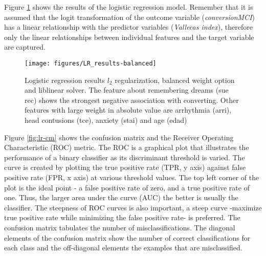 \documentclass[11pt]{article}
\theoremstyle{definition}
\theoremstyle{remark}
\begin{document}
Figure \ref{fig:logresres} shows the results of the logistic regression model. Remember that it is assumed that the logit transformation of the outcome variable (\emph{conversionMCI}) has a linear relationship with the predictor variables (\emph{Vallecas index}), therefore only the linear relationships between individual features and the target variable are captured.

\begin{figure}[H]
        \centering
        \texttt{[image: figures/LR\_results-balanced]}
        \caption{Logistic regression results $l_2$ regularization, balanced weight option and liblinear solver. The feature about remembering dreams (sue rec) shows the strongest negative association with converting. Other features with large weight in absolute value are arrhythmia (arri), head contusions (tce), anxiety (stai) and age (edad)} \label{fig:logresres}
\end{figure}


Figure \ref{fig:lr-cm} shows the confusion matrix and the Receiver Operating Characteristic (ROC) metric. 
The ROC is a graphical plot that illustrates the performance of a binary classifier as its discriminant threshold is varied. The curve is created by plotting the true positive rate (TPR, y axis) against false positive rate (FPR, x axis) at various threshold values. The top left corner of the plot is the ideal point - a false positive rate of zero, and a true positive rate of one. 
Thus, the larger area under the curve (AUC) the better is usually the classifier.
The steepness of ROC curves is also important, a steep curve -maximize true positive rate while minimizing the false positive rate- is preferred.
The confusion matrix tabulates the number of misclassifications. The diagonal elements of the confusion matrix show the number of correct classifications for each class and the off-diagonal elements the examples that are misclassified. 
\end{document}
